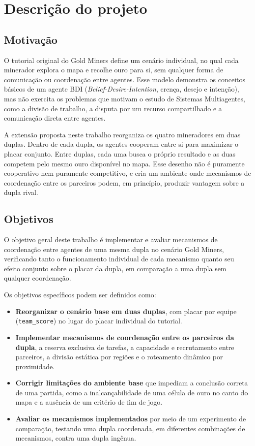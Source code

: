 \documentclass{article}
\begin{document}
\section{Descrição do projeto}

\subsection{Motivação}

O tutorial original do Gold Miners define um cenário individual, no qual cada
minerador explora o mapa e recolhe ouro para si, sem qualquer forma de
comunicação ou coordenação entre agentes. Esse modelo demonstra os conceitos
básicos de um agente BDI (\textit{Belief-Desire-Intention}, crença, desejo e
intenção), mas não exercita os problemas que motivam o estudo de Sistemas
Multiagentes, como a divisão de trabalho, a disputa por um recurso
compartilhado e a comunicação direta entre agentes.

A extensão proposta neste trabalho reorganiza os quatro mineradores em duas
duplas. Dentro de cada dupla, os agentes cooperam entre si para maximizar o
placar conjunto. Entre duplas, cada uma busca o próprio resultado e as duas
competem pelo mesmo ouro disponível no mapa. Esse desenho não é puramente
cooperativo nem puramente competitivo, e cria um ambiente onde mecanismos de
coordenação entre os parceiros podem, em princípio, produzir vantagem sobre
a dupla rival.

\subsection{Objetivos}

O objetivo geral deste trabalho é implementar e avaliar mecanismos de
coordenação entre agentes de uma mesma dupla no cenário Gold Miners,
verificando tanto o funcionamento individual de cada mecanismo quanto seu
efeito conjunto sobre o placar da dupla, em comparação a uma dupla sem
qualquer coordenação.

Os objetivos específicos podem ser definidos como:

\begin{itemize}
    \item \textbf{Reorganizar o cenário base em duas duplas}, com placar por
    equipe (\texttt{team\_score}) no lugar do placar individual do tutorial.
    \item \textbf{Implementar mecanismos de coordenação entre os parceiros
    da dupla}, a reserva exclusiva de tarefas, a capacidade e recrutamento
    entre parceiros, a divisão estática por regiões e o roteamento dinâmico
    por proximidade.
    \item \textbf{Corrigir limitações do ambiente base} que impediam a
    conclusão correta de uma partida, como a inalcançabilidade de uma célula
    de ouro no canto do mapa e a ausência de um critério de fim de jogo.
    \item \textbf{Avaliar os mecanismos implementados} por meio de um
    experimento de comparação, testando uma dupla coordenada, em diferentes
    combinações de mecanismos, contra uma dupla ingênua.
\end{itemize}
\end{document}
